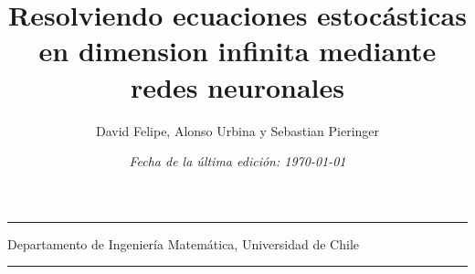 \documentclass[11pt,letterpaper,openany,notitlepage]{article}
\title{\Large Resolviendo ecuaciones estocásticas en dimension infinita mediante redes neuronales}
\author{\normalsize David Felipe, Alonso Urbina y Sebastian Pieringer}
\date{\normalsize \textit{Fecha de la última edición: \today}}
\begin{document}
\maketitle
\vspace{-3em}
\begin{center}
  \rule{\linewidth}{1pt}
  Departamento de Ingeniería Matemática, Universidad de Chile\\
  \rule{0.8\linewidth}{1pt}
\end{center}

\begingroup
\small
\let\clearpage\relax
\tableofcontents
\endgroup
\newpage










\newpage

\appendix









\newpage


\end{document}
